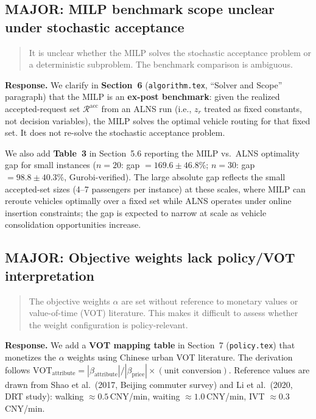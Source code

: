 \documentclass[12pt]{article}
\newenvironment{revcomment}{%
  \begin{quote}\itshape
}{%
  \end{quote}
}
\begin{document}
\bigskip

\subsection*{MAJOR: MILP benchmark scope unclear under stochastic acceptance}

\begin{revcomment}
It is unclear whether the MILP solves the stochastic acceptance problem or a deterministic subproblem. The benchmark comparison is ambiguous.
\end{revcomment}

\textbf{Response.} We clarify in \textbf{Section~6} (\texttt{algorithm.tex}, ``Solver and Scope'' paragraph) that the MILP is an \textbf{ex-post benchmark}: given the realized accepted-request set $\mathcal{R}^{\text{acc}}$ from an ALNS run (i.e., $z_r$ treated as fixed constants, not decision variables), the MILP solves the optimal vehicle routing for that fixed set. It does not re-solve the stochastic acceptance problem.

We also add \textbf{Table~3} in Section~5.6 reporting the MILP vs.\ ALNS optimality gap for small instances ($n = 20$: gap $= 169.6 \pm 46.8\%$; $n = 30$: gap $= 98.8 \pm 40.3\%$, Gurobi-verified). The large absolute gap reflects the small accepted-set sizes (4--7 passengers per instance) at these scales, where MILP can reroute vehicles optimally over a fixed set while ALNS operates under online insertion constraints; the gap is expected to narrow at scale as vehicle consolidation opportunities increase.

\bigskip

\subsection*{MAJOR: Objective weights lack policy/VOT interpretation}

\begin{revcomment}
The objective weights $\alpha$ are set without reference to monetary values or value-of-time (VOT) literature. This makes it difficult to assess whether the weight configuration is policy-relevant.
\end{revcomment}

\textbf{Response.} We add a \textbf{VOT mapping table} in Section~7 (\texttt{policy.tex}) that monetizes the $\alpha$ weights using Chinese urban VOT literature. The derivation follows $\mathrm{VOT}_{\text{attribute}} = |\beta_{\text{attribute}}| / |\beta_{\text{price}}| \times (\text{unit conversion})$. Reference values are drawn from Shao et al.\ (2017, Beijing commuter survey) and Li et al.\ (2020, DRT study): walking $\approx 0.5$\,CNY/min, waiting $\approx 1.0$\,CNY/min, IVT $\approx 0.3$\,CNY/min.
\end{document}

